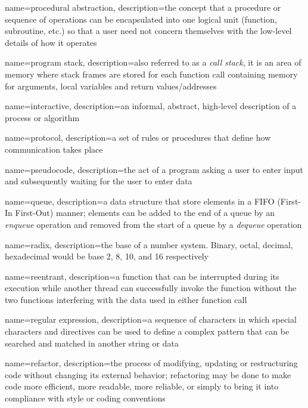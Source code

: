 {
  name=procedural abstraction,
  description={the concept that a procedure or sequence of operations can be encapsulated into one logical unit (function, subroutine, etc.) so that a user need not concern themselves with the low-level details of how it operates}
}

{
  name=program stack,
  description={also referred to as a \emph{call stack}, it is an area of memory where stack frames are stored for each function call containing memory for arguments, local variables and return values/addresses}
}

{
  name=interactive,
  description={an informal, abstract, high-level description of a process or algorithm}
}

{
  name=protocol,
  description={a set of rules or procedures that define how communication takes place}
}

{
  name=pseudocode,
  description={the act of a program asking a user to enter input and subsequently waiting for the user to enter data}
}

{
  name=queue,
  description={a data structure that store elements in a FIFO (First-In First-Out) manner; elements can be added to the end of a queue by an \emph{enqueue} operation and removed from the start of a queue by a \emph{dequeue} operation}
}

{
  name=radix,
  description={the base of a number system.  Binary, octal, decimal, hexadecimal would be base 2, 8, 10, and 16 respectively}
}

{
  name=reentrant,
  description={a function that can be interrupted during its execution while another thread can successfully invoke the function without the two functions interfering with the data used in either function call}
}

{
  name=regular expression,
  description={a sequence of characters in which special characters and directives can be used to define a complex pattern that can be searched and matched in another string or data}
}

{
  name=refactor,
  description={the process of modifying, updating or restructuring code without changing its external behavior; refactoring may be done to make code more efficient, more readable, more reliable, or simply to bring it into compliance with style or coding conventions}
}

